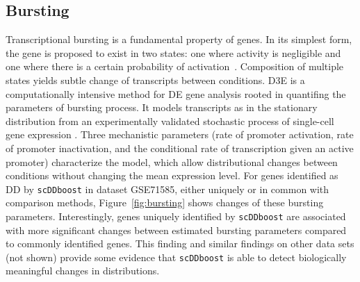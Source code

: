\documentclass[aoas,preprint]{imsart}
\begin{document}
\subsection{Bursting}


Transcriptional bursting is a fundamental property of genes. In its simplest form, the gene is proposed to exist in two states: one where activity is negligible and one where there is a certain probability of 
activation~\citep{Raj:2008aa}. Composition of multiple states yields subtle change of transcripts between conditions. 
D3E\citep{ref:d3e} is a computationally intensive 
method for DE gene analysis rooted in quantifing the parameters of bursting process. It 
models transcripts as in the stationary distribution from an 
experimentally validated stochastic process of single-cell gene expression \citep{Peccoud:1995aa}. 
Three mechanistic parameters (rate of promoter activation, rate of promoter inactivation, 
 and the conditional rate of transcription given an active  promoter) characterize the model, which allow
 distributional changes between conditions without changing the mean expression level.
For genes identified as DD by \verb+scDDboost+ in dataset GSE71585, either uniquely or in common with
comparison methods, Figure~\ref{fig:bursting} shows  changes of these bursting parameters. Interestingly, 
 genes uniquely identified by \verb+scDDboost+ are associated with more 
significant changes between estimated bursting parameters compared to commonly identified genes.
This finding and similar findings on other data sets (not shown) provide some evidence that \verb+scDDboost+
is able to detect biologically meaningful changes in distributions.

\end{document}
